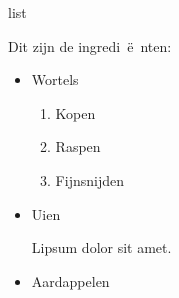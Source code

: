 \endDetail


\begin{saveblock}{list}
    \begin{highlightblock}[linewidth=0.5\textwidth,gobble=8]
        Dit zijn de ingredi~\"e~nten:
        \begin{itemize}
            \item Wortels
            \begin{enumerate}
                \item Kopen
                \item Raspen
                \item Fijnsnijden
            \end{enumerate}			
            \item Uien
            
            Lipsum dolor sit amet.
            \item Aardappelen
        \end{itemize}
    \end{highlightblock}
\end{saveblock}

